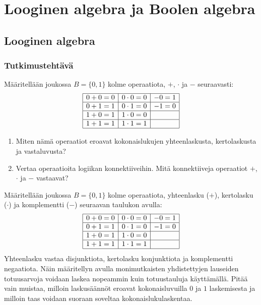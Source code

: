 \chapter{Looginen algebra ja Boolen algebra}%

\section{Looginen algebra}

\subsection*{Tutkimustehtävä}

Määritellään joukossa $B=\{0,1\}$ kolme operaatiota, $+$, $\cdot$ ja $-$ seuraavasti:
\[
\begin{array}{|c|c|c|}
\hline
0+0=0 & 0\cdot0=0 & - 0=1\\
\hline
0+1=1 & 0\cdot1=0 & - 1=0\\
\hline
1+0=1 & 1\cdot0=0 & \\
\hline
1+1=1 & 1\cdot1=1 & \\
\hline

\end{array}
\]
\begin{enumerate}
\item Miten nämä operaatiot eroavat kokonaislukujen yhteenlaskusta, kertolaskusta ja vastaluvusta?
\item Vertaa operaatioita logiikan konnektiiveihin. Mitä konnektiiveja operaatiot $+$, $\cdot$ ja $-$ vastaavat?
\end{enumerate}

Määritellään joukossa $B=\{0,1\}$ kolme operaatiota, yhteenlasku ($+$), kertolasku ($\cdot$) ja komplementti ($-$) seuraavan taulukon avulla:
\[
\begin{array}{|c|c|c|}
\hline
0+0=0 & 0\cdot0=0 & - 0=1\\
\hline
0+1=1 & 0\cdot1=0 & - 1=0\\
\hline
1+0=1 & 1\cdot0=0 & \\
\hline
1+1=1 & 1\cdot1=1 & \\
\hline
\end{array}
\]
Yhteenlasku vastaa disjunktiota, kertolasku konjunktiota ja komplementti negaatiota. Näin määritellyn  avulla monimutkaisten yhdistettyjen lauseiden totuusarvoja voidaan laskea nopeammin kuin totuustauluja käyttämällä. Pitää vain muistaa, milloin lasku\-sään\-nöt eroavat kokonaisluvuilla $0$ ja $1$ laskemisesta ja milloin taas voidaan suoraan soveltaa kokonaislukulaskentaa.


